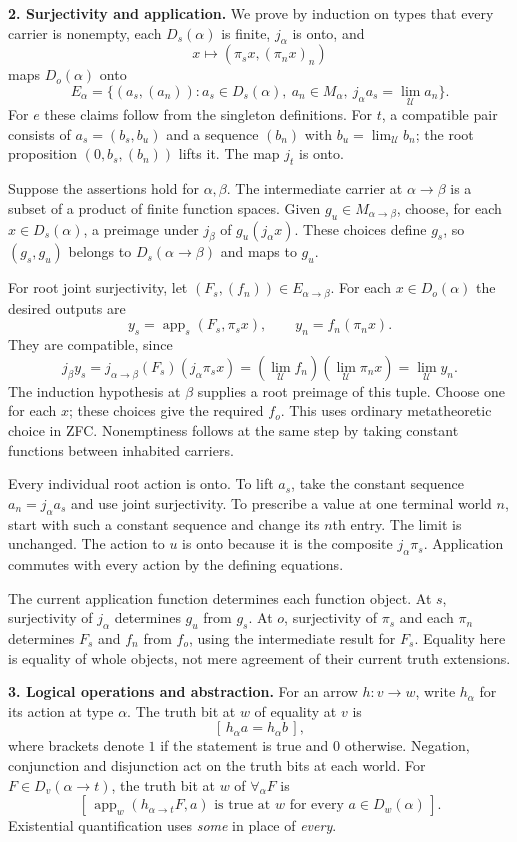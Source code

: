 \documentclass[12pt,leqno]{article}
\newcommand{\U}{\mathcal U}
\begin{document}
\medskip
\noindent\textbf{2. Surjectivity and application.}
We prove by induction on types that every carrier is nonempty,
each $D_s(\alpha)$ is finite, $j_\alpha$ is onto, and
\[
 x\longmapsto(\pi_sx,(\pi_nx)_n)
\]
maps $D_o(\alpha)$ onto
\[
 E_\alpha=
 \{(a_s,(a_n)):a_s\in D_s(\alpha),\ a_n\in M_\alpha,\
                         j_\alpha a_s=\lim_\U a_n\}.
\]
For $e$ these claims follow from the singleton definitions. For $t$,
a compatible pair consists of $a_s=(b_s,b_u)$ and a sequence $(b_n)$
with $b_u=\lim_\U b_n$; the root proposition $(0,b_s,(b_n))$ lifts it.
The map $j_t$ is onto.

Suppose the assertions hold for $\alpha,\beta$.
The intermediate carrier at $\alpha\to\beta$ is a subset of a product
of finite function spaces. Given $g_u\in M_{\alpha\to\beta}$, choose,
for each $x\in D_s(\alpha)$, a preimage under $j_\beta$ of
$g_u(j_\alpha x)$. These choices define $g_s$, so $(g_s,g_u)$
belongs to $D_s(\alpha\to\beta)$ and maps to $g_u$.

For root joint surjectivity, let $(F_s,(f_n))\in E_{\alpha\to\beta}$.
For each $x\in D_o(\alpha)$ the desired outputs are
\[
 y_s=\operatorname{app}_s(F_s,\pi_sx),\qquad y_n=f_n(\pi_nx).
\]
They are compatible, since
\[
 j_\beta y_s
 =j_{\alpha\to\beta}(F_s)(j_\alpha\pi_sx)
 =(\lim_\U f_n)(\lim_\U\pi_nx)
 =\lim_\U y_n.
\]
The induction hypothesis at $\beta$ supplies a root preimage of this
tuple. Choose one for each $x$; these choices give the required $f_o$.
This uses ordinary metatheoretic choice in ZFC. Nonemptiness follows
at the same step by taking constant functions between inhabited carriers.

Every individual root action is onto. To lift $a_s$, take the constant
sequence $a_n=j_\alpha a_s$ and use joint surjectivity. To prescribe
a value at one terminal world $n$, start with such a constant sequence
and change its $n$th entry. The limit is unchanged. The action to $u$
is onto because it is the composite $j_\alpha\pi_s$.
Application commutes with every action by the defining equations.

The current application function determines each function object.
At $s$, surjectivity of $j_\alpha$ determines $g_u$ from $g_s$.
At $o$, surjectivity of $\pi_s$ and each $\pi_n$ determines $F_s$
and $f_n$ from $f_o$, using the intermediate result for $F_s$.
Equality here is equality of whole objects, not mere agreement of
their current truth extensions.

\medskip
\noindent\textbf{3. Logical operations and abstraction.}
For an arrow $h:v\to w$, write $h_\alpha$ for its action at type
$\alpha$. The truth bit at $w$ of equality at $v$ is
\[
 [\,h_\alpha a=h_\alpha b\,],
\]
where brackets denote $1$ if the statement is true and $0$ otherwise.
Negation, conjunction and disjunction act on the truth bits at each
world. For $F\in D_v(\alpha\to t)$, the truth bit at $w$ of
$\forall_\alpha F$ is
\[
 [\,\operatorname{app}_w(h_{\alpha\to t}F,a)
       \text{ is true at }w\text{ for every }a\in D_w(\alpha)\,].
\]
Existential quantification uses \emph{some} in place of \emph{every}.
\end{document}
